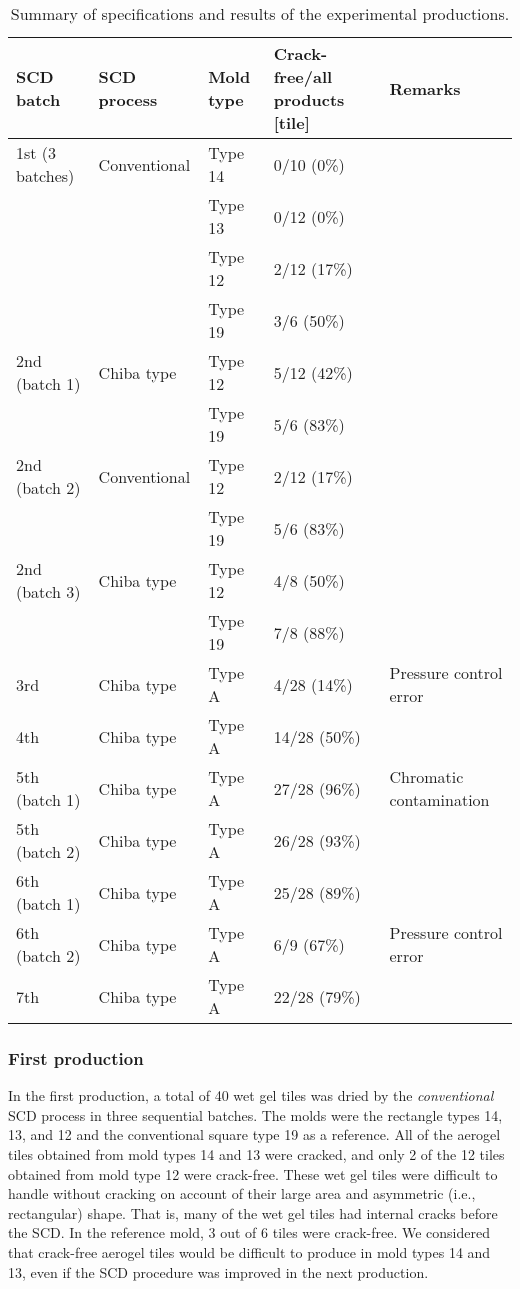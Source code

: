 \documentclass[5p,twocolumn]{elsarticle}
\begin{document}
\begin{table*}[t]
\centering 
\caption{Summary of specifications and results of the experimental productions.}
\label{table:table3}
	\begin{tabular}{lllll}
		\hline
		SCD batch & SCD process & Mold type & Crack-free/all products [tile] & Remarks \\
		\hline
		1st (3 batches) & Conventional & Type 14 & 0/10 (0\%) & \\
		 &  & Type 13 & 0/12 (0\%) & \\
		 &  & Type 12 & 2/12 (17\%) & \\
		 &  & Type 19 & 3/6 (50\%) & \\
		2nd (batch 1) & Chiba type & Type 12 & 5/12 (42\%) & \\
		 &  & Type 19 & 5/6 (83\%) & \\
		2nd (batch 2) & Conventional & Type 12 & 2/12 (17\%) & \\
		 &  & Type 19 & 5/6 (83\%) & \\
		2nd (batch 3) & Chiba type & Type 12 & 4/8 (50\%) & \\
		 &  & Type 19 & 7/8 (88\%) & \\
		3rd & Chiba type & Type A & 4/28 (14\%) & Pressure control error \\
		4th & Chiba type & Type A & 14/28 (50\%) & \\
		5th (batch 1) & Chiba type & Type A & 27/28 (96\%) & Chromatic contamination \\
		5th (batch 2) & Chiba type & Type A & 26/28 (93\%) & \\
		6th (batch 1) & Chiba type & Type A & 25/28 (89\%) & \\
		6th (batch 2) & Chiba type & Type A & 6/9 (67\%) & Pressure control error \\
		7th & Chiba type & Type A & 22/28 (79\%) & \\
		\hline
	\end{tabular}
\end{table*}

\subsubsection{First production}
\label{5-1-1}

In the first production, a total of 40 wet gel tiles was dried by the \textit {conventional} SCD process in three sequential batches. The molds were the rectangle types 14, 13, and 12 and the conventional square type 19 as a reference. All of the aerogel tiles obtained from mold types 14 and 13 were cracked, and only 2 of the 12 tiles obtained from mold type 12 were crack-free. These wet gel tiles were difficult to handle without cracking on account of their large area and asymmetric (i.e., rectangular) shape. That is, many of the wet gel tiles had internal cracks before the SCD. In the reference mold, 3 out of 6 tiles were crack-free. We considered that crack-free aerogel tiles would be difficult to produce in mold types 14 and 13, even if the SCD procedure was improved in the next production.
\end{document}
